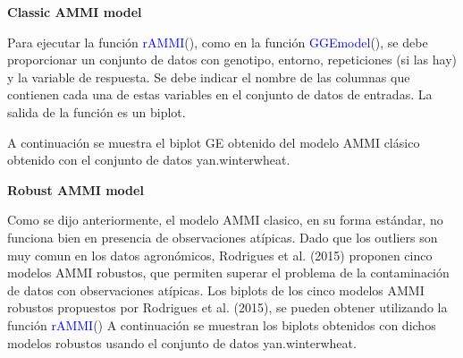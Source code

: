 \textbf{Classic AMMI model}

Para ejecutar la función \textcolor{blue}{rAMMI}(), como en la función \textcolor{blue}{GGEmodel}(), se debe proporcionar un conjunto de datos con genotipo, entorno, repeticiones (si las hay) y la variable de respuesta. Se debe indicar el nombre de las columnas que contienen cada una de estas variables en el conjunto de datos de entradas. La salida de la función es un biplot.

A continuación se muestra el biplot GE obtenido del modelo AMMI clásico obtenido con el conjunto de datos yan.winterwheat.


\textbf{Robust AMMI model}

Como se dijo anteriormente, el modelo AMMI clasico, en su forma estándar, no funciona bien en presencia de observaciones atípicas. Dado que los outliers son muy comun en los datos agronómicos, Rodrigues et al. (2015) proponen cinco modelos AMMI robustos, que permiten superar el problema de la contaminación de datos con observaciones atípicas. Los biplots de los cinco modelos AMMI robustos propuestos por Rodrigues et al. (2015), se pueden obtener utilizando la función \textcolor{blue}{rAMMI}() A continuación se muestran los biplots obtenidos con dichos modelos robustos usando el conjunto de datos yan.winterwheat.

